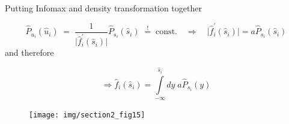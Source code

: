 \begin{frame}{Putting Infomax and density transformation together}

\svspace{-5mm}


\begin{equation}
  \label{eq:dtufs}
		\widehat{P}_{u_i} (\widehat{u}_i) \; = \;   
		 \frac{1}{\big| \widehat{f}_i^{'} (\widehat{s}_i) \big|} 
		\widehat{P}_{s_i}(\widehat{s}_i) \; \stackrel{!}{=} \; \text{const.} \quad \Rightarrow \quad 
		 \big| \widehat{f}_i^{'} (\widehat{s}_i) \big| =  a \widehat{P}_{s_i}(\widehat{s}_i) 
\end{equation}
and therefore

\svspace{-3mm}

\begin{equation}
\Rightarrow \widehat{f}_i (\widehat{s}_i)
 = \int\limits_{-\infty}^{\widehat{s}_i} dy\; a 
			\widehat{P}_{s_i}(y)
\end{equation}

\begin{figure}[h]
  \centering
  \texttt{[image: img/section2\_fig15]}  
  \label{fig:cdf}
\end{figure}

\svspace{-2mm}



\end{frame}

\newpage

